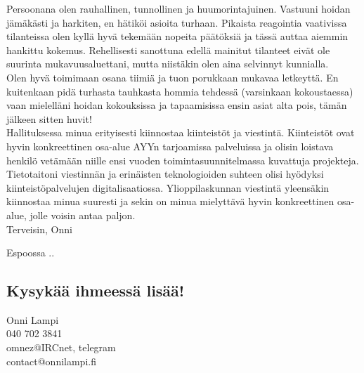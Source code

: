 \documentclass[a4paper, 12pt, finnish]{report}
\newcommand*{\findate}{\the\day.\the\month.\the\year}
\begin{document}
Persoonana olen rauhallinen, tunnollinen ja huumorintajuinen.
Vastuuni hoidan jämäkästi ja harkiten, en hätiköi asioita turhaan.
Pikaista reagointia vaativissa tilanteissa olen kyllä hyvä tekemään nopeita päätöksiä ja tässä auttaa aiemmin hankittu kokemus.
Rehellisesti sanottuna edellä mainitut tilanteet eivät ole suurinta mukavuusaluettani, mutta niistäkin olen aina selvinnyt kunnialla.\\

Olen hyvä toimimaan osana tiimiä ja tuon porukkaan mukavaa letkeyttä.
En kuitenkaan pidä turhasta tauhkasta hommia tehdessä (varsinkaan kokoustaessa) vaan mielelläni hoidan kokouksissa ja tapaamisissa ensin asiat alta pois, tämän jälkeen sitten huvit!\\

Hallituksessa minua erityisesti kiinnostaa kiinteistöt ja viestintä.
Kiinteistöt ovat hyvin konkreettinen osa-alue AYYn tarjoamissa palveluissa ja olisin loistava henkilö vetämään niille ensi vuoden toimintasuunnitelmassa kuvattuja projekteja.
Tietotaitoni viestinnän ja erinäisten teknologioiden suhteen olisi hyödyksi kiinteistöpalvelujen digitalisaatiossa.
Ylioppilaskunnan viestintä yleensäkin kiinnostaa minua suuresti ja sekin on minua mielyttävä hyvin konkreettinen osa-alue, jolle voisin antaa paljon.\\
Terveisin, Onni

Espoossa \findate

\subsection*{Kysykää ihmeessä lisää!}
Onni Lampi\\
040 702 3841\\
omnez@IRCnet, telegram\\
contact@onnilampi.fi
\end{document}
